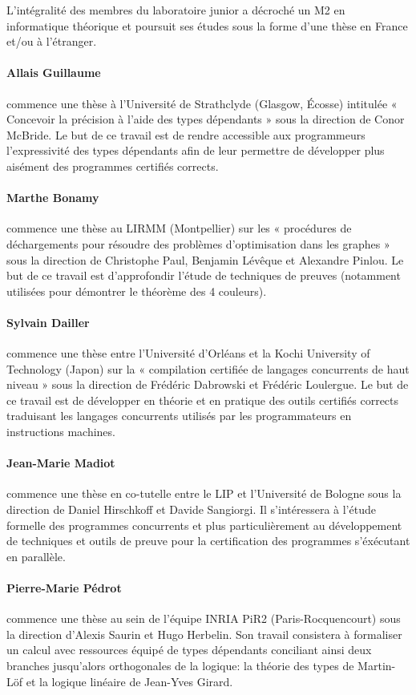 
L'intégralité des membres du laboratoire junior a décroché un M2
en informatique théorique et poursuit ses études sous la forme
d'une thèse en France et/ou à l'étranger.

\paragraph{Allais Guillaume} commence une thèse à l'Université de
Strathclyde (Glasgow, Écosse) intitulée « Concevoir la précision
à l'aide des types dépendants » sous la direction de Conor McBride.
Le but de ce travail est de rendre accessible aux programmeurs
l'expressivité des types dépendants afin de leur permettre de
développer plus aisément des programmes certifiés corrects.

\paragraph{Marthe Bonamy} commence une thèse au LIRMM (Montpellier)
sur les « procédures de déchargements pour résoudre des problèmes
d'optimisation dans les graphes » sous la direction de Christophe
Paul, Benjamin Lévêque et Alexandre Pinlou.
Le but de ce travail est d'approfondir l'étude de techniques de
preuves (notamment utilisées pour démontrer le théorème des 4 couleurs).

\paragraph{Sylvain Dailler} commence une thèse entre
l'Université d'Orléans et la Kochi University of Technology (Japon)
sur la « compilation certifiée de langages concurrents de haut niveau »
sous la direction de Frédéric Dabrowski et Frédéric Loulergue.
Le but de ce travail est de développer en théorie et en pratique des
outils certifiés corrects traduisant les langages concurrents utilisés
par les programmateurs en instructions machines.

\paragraph{Jean-Marie Madiot} commence une thèse en co-tutelle entre
le LIP et l'Université de Bologne sous la direction de Daniel Hirschkoff
et Davide Sangiorgi. Il s'intéressera à l'étude formelle des programmes
concurrents et plus particulièrement au développement de techniques et
outils de preuve pour la certification des programmes s'éxécutant en
parallèle.

\paragraph{Pierre-Marie Pédrot} commence une thèse au sein de l'équipe
INRIA PiR2 (Paris-Rocquencourt) sous la direction d'Alexis Saurin et Hugo
Herbelin. Son travail consistera à formaliser un  calcul avec ressources
équipé de types dépendants conciliant ainsi deux branches jusqu'alors
orthogonales de la logique: la théorie des types de Martin-Löf et la logique
linéaire de Jean-Yves Girard.


